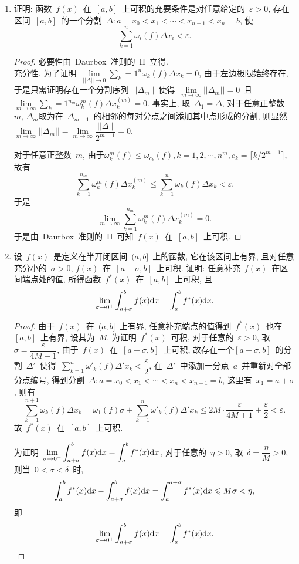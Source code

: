 \documentclass[UTF8,a4paper,20pt]{article}
\begin{document}
\begin{enumerate}
\item 证明: 函数~$f(x)$~在~$[a,b]$~上可积的充要条件是对任意给定的~$\varepsilon>0$, 存在区间~$[a,b]$~的一个分割~$\Delta: a=x_0<x_1<\cdots<x_{n-1}<x_n=b$, 使
\[\sum_{k=1}^n\omega_i(f)\Delta x_i<\varepsilon.\]
\begin{proof}
	必要性由~Daurbox~准则的~II~立得.\\
	充分性. 为了证明~$\lim\limits_{||\Delta||\to 0} \sum_k=1^n \omega_k(f)\Delta x_k=0$, 由于左边极限始终存在, 于是只需证明存在一个分割序列~$||\Delta_m||$~使得~$\lim\limits_{m\to\infty}||\Delta_m||=0$~且~$\lim\limits_{m\to\infty}\sum_k=1^{n_m}\omega_k^m(f)\Delta x_k^{(m)}=0$. 事实上, 取~$\Delta_1=\Delta$, 对于任意正整数~$m$, $\Delta_{m}$取为在~$\Delta_{m-1}$~的相邻的每对分点之间添加其中点形成的分割, 则显然$\lim\limits_{m\to\infty} ||\Delta_m||=\lim\limits_{m\to\infty}\dfrac{||\Delta||}{2^{m-1}}=0$.

	对于任意正整数~$m$, 由于$\omega_k^m(f)\leqslant \omega_{c_k}(f), k=1,2,\cdots, n^m, c_k=\lceil k/2^{m-1}\rceil$, 故有
	\[\sum_{k=1}^{n_m}\omega_k^m(f)\Delta x_k^{(m)}\leqslant \sum_{k=1}^{n}\omega_k(f)\Delta x_k<\varepsilon.\]
于是
	\[\lim_{m\to\infty}\sum_{k=1}^{n_m} \omega_k^m(f)\Delta x_k^{(m)}=0.\]
于是由~Daurbox~准则的~II~可知~$f(x)$~在~$[a,b]$~上可积.
\end{proof}

\item 设~$f(x)$~是定义在半开闭区间~$(a,b]$~上的函数, 它在该区间上有界, 且对任意充分小的~$\sigma>0$, $f(x)$~在~$[a+\sigma,b]$~上可积. 证明: 任意补充~$f(x)$~在区间端点处的值, 所得函数~$f^{*}(x)$~在~$[a,b]$~上可积, 且
\[\lim_{\sigma\to 0^{+}}\int_{a+\sigma}^b f(x)\mathrm{d}x=\int_a^b f^{*}(x)\mathrm{d}x.\]
\begin{proof}
	由于~$f(x)$~在~$(a,b]$~上有界, 任意补充端点的值得到~$f^{*}(x)$~也在~$[a,b]$~上有界, 设其为~$M$. 为证明~$f^{*}(x)$~可积, 对于任意的~$\varepsilon>0$, 取~$\sigma=\dfrac{\varepsilon}{4M+1}$, 由于~$f(x)$~在~$[a+\sigma, b]$~上可积, 故存在一个$[a+\sigma, b]$~的分割~$\Delta'$~使得~$\sum\limits_{k=1}^n\omega'_k(f)\Delta' x_k<\dfrac{\varepsilon}{2}$, 在~$\Delta'$~中添加一分点~$a$~并重新对全部分点编号, 得到分割~$\Delta: a=x_0<x_1<\cdots<x_n<x_{n+1}=b$, 这里有~$x_1=a+\sigma$, 则有
	\[\sum_{k=1}^{n+1} \omega_k(f) \Delta x_k=\omega_1(f)\sigma+\sum_{k=1}^{n} \omega'_k(f)\Delta' x_k\leqslant 2M\cdot\dfrac{\varepsilon}{4M+1}+\dfrac{\varepsilon}{2}<\varepsilon.\]
	故~$f^{*}(x)$~在~$[a,b]$~上可积.

	为证明~$\displaystyle \lim\limits_{\sigma\to 0^{+}}\int_{a+\sigma}^b f(x)\mathrm{d}x=\int_a^b f^{*}(x)\mathrm{d}x$, 对于任意的~$\eta>0$, 取~$\delta=\dfrac{\eta}{M}>0$, 则当~$0<\sigma<\delta$~时,
	\[\int_a^b f^{*}(x)\mathrm{d}x-\int_{a+\sigma}^b f(x)\mathrm{d}x=\int_a^{a+\sigma} f^{*}(x)\mathrm{d}x\leqslant M\sigma<\eta,\]
即
	\[\lim_{\sigma\to 0^{+}}\int_{a+\sigma}^b f(x)\mathrm{d}x=\int_a^b f^{*}(x)\mathrm{d}x.\]
\end{proof}


\end{enumerate}
\end{document}

